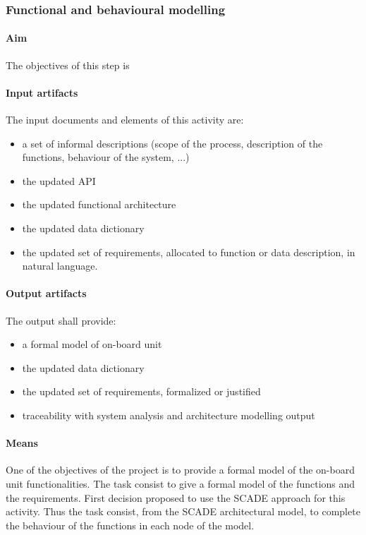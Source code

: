 \subsubsection{Functional and behavioural modelling}


\paragraph{Aim}
The objectives of this step is 


\paragraph{Input artifacts}

The input documents and elements of this activity are:
\begin{itemize}
\item a set of informal descriptions (scope of the process, description of the functions, behaviour of the system, ...)
\item the updated API
\item the updated functional architecture 
\item the updated data dictionary 
\item the updated set of requirements, allocated to function or data description, in natural language. 
\end{itemize}


\paragraph{Output artifacts}

The output shall provide:
\begin{itemize}
\item a formal model of on-board unit
\item the updated data dictionary 
\item the updated set of requirements, formalized or justified
\item traceability  with system analysis and architecture modelling output
\end{itemize}

\paragraph{Means}

One of the objectives of the project is to provide a formal model of the on-board unit functionalities. The task consist to give a formal model of the functions and the requirements.
First decision proposed to use the SCADE approach for this activity.
Thus the task  consist, from the SCADE architectural model, to complete the behaviour of the functions in each node of the model. 


